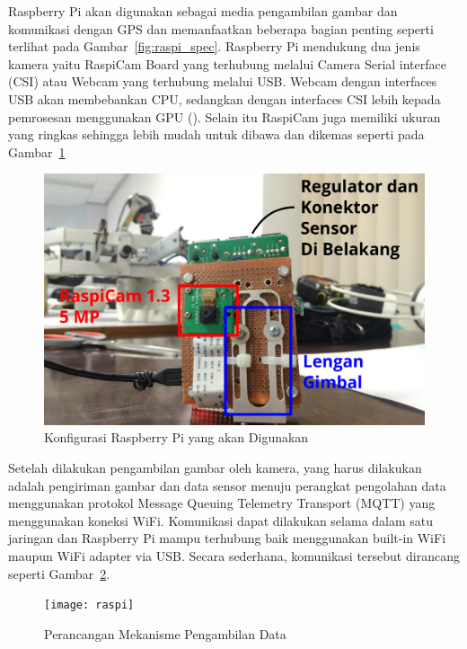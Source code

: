 Raspberry Pi akan digunakan sebagai media pengambilan gambar dan komunikasi dengan GPS dan memanfaatkan beberapa bagian penting seperti terlihat pada Gambar~\ref{fig:raspi_spec}. Raspberry Pi mendukung dua jenis kamera yaitu RaspiCam Board yang terhubung melalui Camera Serial interface (CSI) atau Webcam yang terhubung melalui USB. Webcam dengan interfaces USB akan membebankan CPU, sedangkan dengan interfaces CSI lebih kepada pemrosesan menggunakan GPU (\citet[p.~42]{creasey2015raspberry}). Selain itu RaspiCam juga memiliki ukuran yang ringkas sehingga lebih mudah untuk dibawa dan dikemas seperti pada Gambar~\ref{fig:raspiku}

\begin{figure}[ht]
 \centering
 \includegraphics[width=\textwidth]{raspiku}
 \caption{Konfigurasi Raspberry Pi yang akan Digunakan}
 \label{fig:raspiku}   
\end{figure}  

Setelah dilakukan pengambilan gambar oleh kamera, yang harus dilakukan adalah pengiriman gambar dan data sensor menuju perangkat pengolahan data menggunakan protokol Message Queuing Telemetry Transport (MQTT) yang menggunakan koneksi WiFi. Komunikasi dapat dilakukan selama dalam satu jaringan dan Raspberry Pi mampu terhubung baik menggunakan built-in WiFi maupun WiFi adapter via USB. Secara sederhana, komunikasi tersebut dirancang seperti Gambar~\ref{fig:raspi}.

\begin{figure}[ht]
 \centering
 \texttt{[image: raspi]}
 \caption{Perancangan Mekanisme Pengambilan Data}
 \label{fig:raspi}   
\end{figure}   

